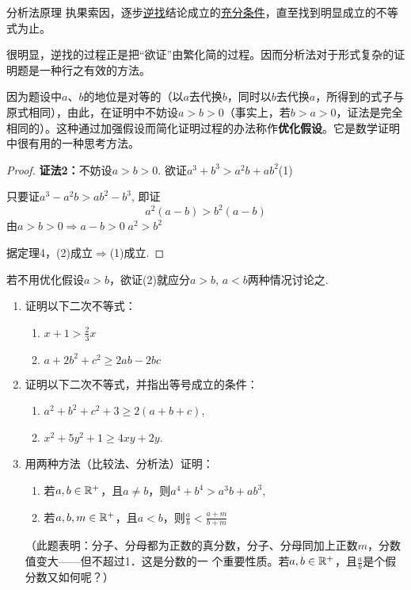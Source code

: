 \begin{thm}{分析法原理 }
    执果索因，逐步\underline{逆找}结论成立的\underline{充分条件}，直至找到明显成立的不等式为止。
\end{thm}

很明显，逆找的过程正是把“欲证”由繁化简的过程。因而分析法对于形式复杂的证明题是一种行之有效的方法。

\begin{analyze}
    因为题设中$a$、$b$的地位是对等的（以$a$去代换$b$，同时以$b$去代换$a$，所得到的式子与原式相同），由此，在证明中不妨设$a>b>0$（事实上，若$b>a>0$，证法是完全相同的）。这种通过加强假设而简化证明过程的办法称作\textbf{优化假设}。它是数学证明中很有用的一种思考方法。
\end{analyze}

\begin{proof}
\textbf{证法2：}不妨设$a>b>0$. 欲证$a^3+b^3>a^2b+ab^2$\hfill (1)

只要证$a^3-a^2b>ab^2-b^3$, 即证
\begin{equation}
    a^2(a-b)>b^2(a-b) \tag{2}
\end{equation}
由$a>b>0\Longrightarrow a-b>0\; a^2>b^2$

据定理4，(2)成立$\Longrightarrow$(1)成立.
\end{proof}

\begin{rmk}
    若不用优化假设$a>b$，欲证(2)就应分$a>b$, $a<b$两种情况讨论之.
\end{rmk}

\begin{ex}
\begin{enumerate}
    \item 证明以下二次不等式：
\begin{enumerate}[(1)]
    \item $x+1>\frac{2}{3}x$
    \item $a+2b^2+c^2\ge 2ab-2bc$
\end{enumerate}

    \item 证明以下二次不等式，并指出等号成立的条件：
\begin{enumerate}[(1)]
\item $a^2+b^2+c^2+3\ge 2(a+b+c)$,
\item $x^2+5y^2+1\ge 4xy+2y$.
\end{enumerate}

    \item 用两种方法（比较法、分析法）证明：
\begin{enumerate}[(1)]
    \item 若$a,b\in\mathbb{R}^+$，且$a\ne b$，则$a^4+b^4>a^3b+ab^3$,
    \item 若$a,b,m\in\mathbb{R}^+$，且$a<b$，则$\frac{a}{b}<\frac{a+m}{b+m}$
\end{enumerate}

    （此题表明：分子、分母都为正数的真分数，分子、分母同加上正数$m$，分数值变大——但不超过1．这是分数的一
    个重要性质。若$a,b\in\mathbb{R}^+$，且$\frac{a}{b}$是个假分数又如何呢？）
\end{enumerate}
\end{ex}


